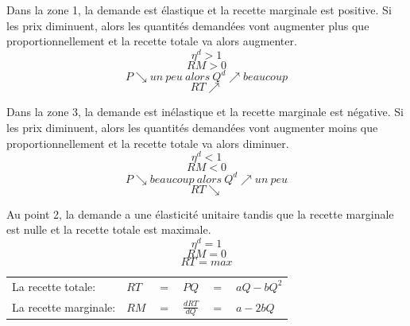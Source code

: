 \begin{minipage}{0.6\textwidth}
    Dans la zone 1, la demande est \textcolor[rgb]{1,0,0}{élastique} et la recette marginale est \textcolor[rgb]{1,0,0}{positive}.
		Si les prix diminuent, alors les quantités demandées vont \textcolor[rgb]{1,0,0}{augmenter plus} que proportionnellement et la recette totale va alors \textcolor[rgb]{1,0,0}{augmenter}.
		$$\eta^d > 1$$
		$$RM > 0$$
		$$P \searrow un\ peu\ alors\ Q^d \nearrow beaucoup$$
		$$RT \nearrow$$

		Dans la zone 3, la demande est \textcolor[rgb]{1,0,0}{inélastique} et la recette marginale est \textcolor[rgb]{1,0,0}{négative}.
		Si les prix diminuent, alors les quantités demandées vont \textcolor[rgb]{1,0,0}{augmenter} moins que proportionnellement et la recette totale va alors \textcolor[rgb]{1,0,0}{diminuer}.
		$$\eta^d < 1$$
		$$RM < 0$$
		$$P \searrow beaucoup\ alors\ Q^d \nearrow un\ peu$$
		$$RT \searrow$$

		Au point 2, la demande a une élasticité unitaire tandis que la recette marginale est nulle et la recette totale est maximale.
		$$\eta^d = 1$$
		$$RM = 0$$
		$$RT = max$$
    
    \begin{tabular}{llllll}
        La recette totale:    & $RT$ & $=$ & $PQ$ & $=$ & $aQ - bQ^2$\\
        La recette marginale: & $RM$ & $=$ & $\frac{dRT}{dQ}$ & $=$ & $a - 2bQ$\\
    \end{tabular}
\end{minipage}